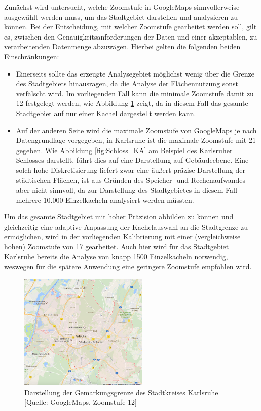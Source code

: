 Zunächst wird untersucht, welche Zoomstufe in GoogleMaps sinnvollerweise ausgewählt werden muss, um das Stadtgebiet darstellen und analysieren zu können. Bei der Entscheidung, mit welcher Zoomstufe gearbeitet werden soll, gilt es, zwischen den Genauigkeitsanforderungen  der Daten und einer akzeptablen, zu verarbeitenden Datenmenge abzuwägen. Hierbei gelten die folgenden beiden Einschränkungen:
\begin{itemize}
\item Einerseits sollte das erzeugte Analysegebiet möglichst wenig über die Grenze des Stadtgebiets hinausragen, da die Analyse der Flächennutzung sonst verfälscht wird. Im vorliegenden Fall kann die minimale Zoomstufe damit zu 12 festgelegt werden, wie Abbildung \ref{fig:Stadtgebiet_KA} zeigt, da in diesem Fall das gesamte Stadtgebiet auf nur einer Kachel dargestellt werden kann.
\item Auf der anderen Seite wird die maximale Zoomstufe von GoogleMaps je nach Datengrundlage vorgegeben, in Karlsruhe ist die maximale Zoomstufe mit 21 gegeben. Wie Abbildung \ref{fig:Schloss_KA} am Beispiel des Karlsruher Schlosses darstellt, führt dies auf eine Darstellung auf Gebäudeebene. Eine solch hohe Diskretisierung liefert zwar eine äußert präzise Darstellung der städtischen Flächen, ist aus Gründen des Speicher- und Rechenaufwandes aber nicht sinnvoll, da zur Darstellung des Stadtgebietes in diesem Fall mehrere 10.000 Einzelkacheln analysiert werden müssten.
\end{itemize}
Um das gesamte Stadtgebiet mit hoher Präzision abbilden zu können und gleichzeitig eine adaptive Anpassung der Kachelauswahl an die Stadtgrenze zu ermöglichen, wird in der vorliegenden Kalibrierung mit einer (vergleichweise hohen) Zoomstufe von 17 gearbeitet. Auch hier wird für das Stadtgebiet Karlsruhe bereits die Analyse von knapp 1500 Einzelkacheln notwendig, weswegen für die spätere Anwendung eine geringere Zoomstufe empfohlen wird.\\

\begin{figure}
  \centering
    \includegraphics[width=0.55\textwidth]{images/3_Stadtgebiet_KA_zoom12.png}
    \caption{Darstellung der Gemarkungsgrenze des Stadtkreises Karlsruhe [Quelle: GoogleMaps, Zoomstufe 12]}
    \label{fig:Stadtgebiet_KA}
\end{figure}

